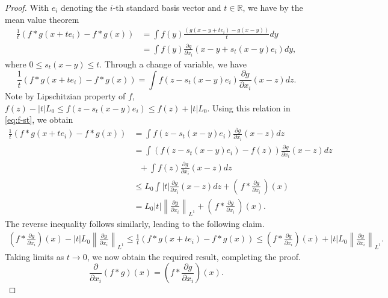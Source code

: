\documentclass[11pt,reqno]{amsart}
\newcommand{\pl}{\partial}
\newcommand{\1}{{\bf 1}}
\newcommand{\2}{{\bf 2}}
\newcommand{\pc}[1]{{\color{cyan}#1}}
\newcommand{\us}[1]{\textcolor{red}{#1}}
\newcommand{\R}{\mathbb R}
\newcommand{\lp}{\left(}
\newcommand{\rp}{\right)}
\newcommand{\lnn}{\left\|}
\newcommand{\rnn}{\right\|}
\numberwithin{equation}{section}
\theoremstyle{remark}
\newcommand{\beq}{\begin{equation}}
\newcommand{\eeq}{\end{equation}}
\begin{document}
		\begin{proof}
		With $e_i$ denoting the $i$-th standard basis vector and $t \in \R$, we have by the mean value theorem
		\begin{align*}
			\frac{1}{t} \lp f \ast g (x +t e_i) - f \ast g (x) \rp & = \int f(y) \frac{\lp g(x-y+t e_i) - g(x-y) \rp}{t} dy\\
			& = \int f(y) \frac{\pl g}{\pl x_i} (x -y +s_t(x-y) e_i) dy,
		\end{align*}
		where $0 \leq s_t(x-y) \leq t$. Through a change of variable, we have
		\beq\label{eq:f-st}
		\frac{1}{t} \lp f \ast g (x +t e_i) - f \ast g (x) \rp = \int f(z - s_t(x-y) e_i) \frac{\pl g}{\pl x_i} (x - z) dz. 
		\eeq
		Note by Lipschitzian property of $f$, $f(z)-|t| L_0 \leq f(z - s_t(x-y) e_i) \leq f(z)+|t| L_0$. Using this relation in \eqref{eq:f-st}, we obtain 
		\begin{align*}
			\frac{1}{t} \lp f \ast g (x +t e_i) - f \ast g (x) \rp   & = \int f(z - s_t(x-y) e_i) \frac{\pl g}{\pl x_i} (x - z) dz \\
			& = \int \left(f(z - s_t(x-y) e_i) - f(z) \right) \frac{\pl g}{\pl x_i} (x - z) dz \\
			&~~~+ \int f(z)  \frac{\pl g}{\pl x_i} (x - z) dz \\
			& \le L_0 \int  | t| \frac{\pl g}{\pl x_i} (x - z) dz +  \left(\, f *  \frac{\pl g}{\pl x_i}\,\right) (x) \\
			& = L_0 |t| {\lnn \frac{\pl g}{\pl x_i} \rnn}_{L^1} +  \left(\, f *  \frac{\pl g}{\pl x_i}\,\right) (x).
		\end{align*}
		The reverse inequality follows similarly, leading to the following claim. 
		\begin{align*}
			\lp f \ast \frac{\pl g}{\pl x_i}\rp (x) - |t| L_0 {\lnn \frac{\pl g}{\pl x_i} \rnn}_{L^1} \leq \frac{1}{t} \lp f \ast g (x +t e_i) - f \ast g (x) \rp \leq \lp f \ast \frac{\pl g}{\pl x_i} \rp (x) +|t| L_0  {\lnn \frac{\pl g}{\pl x_i} \rnn}_{L^1}.
		\end{align*}
		Taking limits as $t \to 0$, we now obtain the required result, completing the proof.
		$$
		\frac{\pl }{\pl x_i} \lp f \ast g \rp (x) = \lp f \ast \frac{\pl g}{\pl x_i} \rp (x).
		$$
		\end{proof}
		\medskip
		
\end{document}
